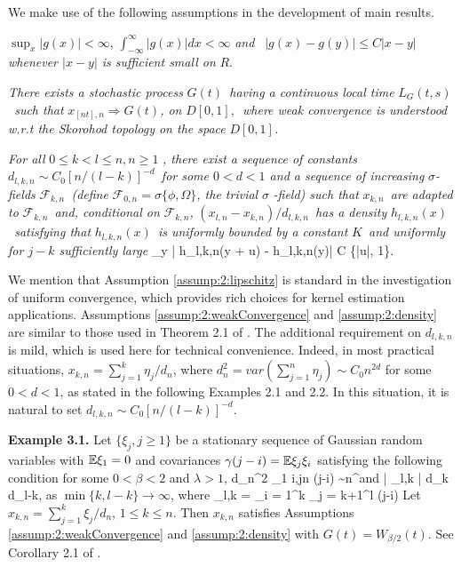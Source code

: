 We make use of the following assumptions in the development of main results.

\begin{assump} 
	$\sup_x|g(x)|<\infty$, $\int_{-\infty}^{\infty}|g(x)|dx<\infty$ \textit{and }\textit{\
	$|g(x)-g(y)|\le C|x-y|$ whenever  $|x-y|$ is sufficient small on }$R$.
\end{assump}

\begin{assump} 
\textit{There exists a stochastic process }%
$G(t)$\textit{\ having a continuous local time
}$L_{G}(t,s)$\textit{\ such that }$x_{[nt],n}\Rightarrow
G(t)$\textit{, on }$D[0,1],$\textit{\ where
weak convergence is understood w.r.t the Skorohod topology on the space }$%
D[0,1]$\textit{.}
\end{assump}

\begin{assump} 
 \textit{For all }$0\leq k<l\leq n,n\geq 1$ \textit{, there exist a sequence of constants }$d_{l,k,n}\sim C_0 [n/(l-k)]^{-d}$\textit{\ for some $0< d<1$
and a
sequence of increasing }$\sigma $\textit{-fields }${\mathcal F}_{k,n}$\textit{\ (define }$%
{\mathcal F}_{0,n}=\sigma \{\phi ,\Omega \}$\textit{, the trivial }$\sigma $\textit{%
-field) such that} $x_{k,n}$\textit{\ are adapted to }${\mathcal F}_{k,n}$\textit{\
and, conditional on }${\mathcal F}_{k,n}$\textit{,
}$(x_{l,n}-x_{k,n})/d_{l,k,n}$\textit{\ has a density
}$h_{l,k,n}(x)$\textit{\ satisfying that }$h_{l,k,n}(x)$\textit{\ is
uniformly bounded by a constant }$K$\textit{\ and uniformly for $j-k$ sufficiently large}
\be
 \sup_y | h_{l,k,n}(y + u) - h_{l,k,n}(y)| \le C \min\{|u|, 1\}. \la {eqn:2:77}
\ee
\end{assump}

We mention that Assumption \ref{assump:2:lipschitz} is standard in the investigation of uniform convergence,
which provides rich choices for kernel estimation applications. Assumptions \ref{assump:2:weakConvergence} and \ref{assump:2:density} are similar to those used in Theorem 2.1 of \cite{wangphillips2010a}. The additional requirement on $d_{l,k,n}$ is mild, which is used here for technical convenience.
Indeed, in  most practical situations, $x_{k,n}=\sum_{j=1}^k \eta_j/d_n$, where $d_n^2= var (\sum_{j=1}^n\eta_j)\sim C_0n^{2d}$ for some $0< d<1$, as stated in the following Examples 2.1 and 2.2. In this situation, it is natural to set $d_{l,k,n}\sim C_0 [n/(l-k)]^{-d}$.


\medskip
{\bf Example 3.1.} Let $\{ \xi_j, j \ge 1\}$ be a stationary sequence of Gaussian random variables  with $\mathbb E \xi_1 = 0$ and covariances $\gamma( j - i) = \mathbb E \xi_j \xi_i$ satisfying the following condition for some $0 < \beta < 2$ and $\lambda > 1$,
\be
d_n^2 \equiv \sum_{1 \le i,j\le n} \gamma(j-i) \sim n^\beta \quad  and \quad  | \tilde{\gamma}_{l,k} | \le \lambda d_k d_{l-k},
\ee
as $\min \{k, l-k\} \to \infty$, where
\be
\tilde{\gamma}_{l,k} = \sum_{i = 1}^k \sum_{j = k+1}^l \gamma(j-i)
\ee
Let $x_{k,n}= \sum_{j = 1}^k \xi_j/d_n$, $1 \le k \le n$. Then $x_{k,n}$ satisfies Assumptions \ref{assump:2:weakConvergence} and \ref{assump:2:density} with $G(t) = W_{\beta/2}(t)$.   See Corollary 2.1 of \cite{wangphillips2010a}.

